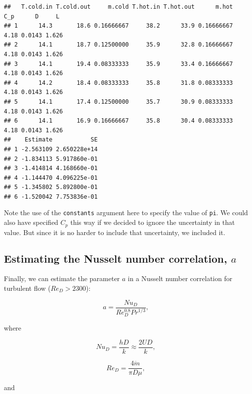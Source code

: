 \documentclass[twoside]{book}\usepackage[]{graphicx}\usepackage[]{xcolor}
\makeatletter
\newenvironment{kframe}{%
 \def\at@end@of@kframe{}%
 \ifinner\ifhmode%
  \def\at@end@of@kframe{\end{minipage}}%
  \begin{minipage}{\columnwidth}%
 \fi\fi%
 \def\FrameCommand##1{\hskip\@totalleftmargin \hskip-\fboxsep
 \colorbox{shadecolor}{##1}\hskip-\fboxsep
     \hskip-\linewidth \hskip-\@totalleftmargin \hskip\columnwidth}%
 \MakeFramed {\advance\hsize-\width
   \@totalleftmargin\z@ \linewidth\hsize
   \@setminipage}}%
 {\par\unskip\endMakeFramed%
 \at@end@of@kframe}
\newenvironment{knitrout}{}{} %
\newcommand{\variable}[1]{{\color{green!50!black}\texttt{#1}}}
\newcommand{\option}[1]{{\color{brown!80!black}\texttt{#1}}}
\makeatother
\begin{document}
\begin{knitrout}
\begin{kframe}
{\ttfamily\noindent\itshape\color{messagecolor}{\#\# Converting uncertainties to a covariance matrix assuming independence ...}}\begin{verbatim}
##   T.cold.in T.cold.out     m.cold T.hot.in T.hot.out      m.hot  C_p      D     L
## 1      14.3       18.6 0.16666667     38.2      33.9 0.16666667 4.18 0.0143 1.626
## 2      14.1       18.7 0.12500000     35.9      32.8 0.16666667 4.18 0.0143 1.626
## 3      14.1       19.4 0.08333333     35.9      33.4 0.16666667 4.18 0.0143 1.626
## 4      14.2       18.4 0.08333333     35.8      31.8 0.08333333 4.18 0.0143 1.626
## 5      14.1       17.4 0.12500000     35.7      30.9 0.08333333 4.18 0.0143 1.626
## 6      14.1       16.9 0.16666667     35.8      30.4 0.08333333 4.18 0.0143 1.626
##    Estimate           SE
## 1 -2.563109 2.650228e+14
## 2 -1.834113 5.917860e-01
## 3 -1.414814 4.168660e-01
## 4 -1.144470 4.096225e-01
## 5 -1.345802 5.892800e-01
## 6 -1.520042 7.753836e-01
\end{verbatim}
\end{kframe}
\end{knitrout}

Note the use of the \option{constants} argument here to specify the value of \variable{pi}.  
We could also have specified $C_p$ this way if we decided to ignore the uncertainty
in that value.  But since it is no harder to include that uncertainty, we included it.


\subsection{Estimating the Nusselt number correlation,  $a$}

Finally, we can estimate
the parameter $a$ in a Nusselt number correlation
for turbulent flow ($Re_{D} > 2300$):

\begin{equation}
    a = \frac{Nu_D}{Re_{D}^{0.8} Pr^{1/3}},
\end{equation}

\noindent{}where

\begin{equation}
	Nu_{D} = \frac{h D}{k} \approx \frac{ 2 U D}{k}, 
\end{equation}

\begin{equation}
    Re_{D} = \frac{4 \dot{m}}{\pi D \mu},
\end{equation}

\noindent{}and
\end{document}
